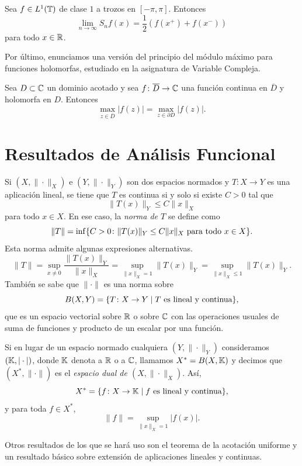 \documentclass[a4paper, 12pt]{book}
\begin{document}
\begin{theorem}\label{1.2.11}
    Sea $f \in L^1(\mathbb T)$ de clase $1$ a trozos en $[-\pi,\pi]$. Entonces
    \[\lim_{n\to\infty}S_nf(x) = \frac{1}{2}(f(x^+)+f(x^-))\]
    para todo $x \in \mathbb R$.
\end{theorem}

Por último, enunciamos una versión del principio del módulo máximo para funciones holomorfas, estudiado en la asignatura de Variable Compleja.

\begin{theorem}\label{1.2.12}
    Sea $D\subset\mathbb C$ un dominio acotado y sea $f \colon \overline{D} \to \mathbb C$ una función continua en $\overline{D}$ y holomorfa en $D$. Entonces
    \[\max_{z\in\overline{D}}|f(z)| = \max_{z \in \partial D}|f(z)|.\]
\end{theorem}

\section{Resultados de Análisis Funcional}

Si $(X,\|\cdot\|_X)$ e $(Y,\|\cdot\|_Y)$ son dos espacios normados y $T \colon X \to Y$ es una aplicación lineal, se tiene que $T$ es continua si y solo si existe $C > 0$ tal que
\[\|T(x)\|_Y \leq C\|x\|_X\]
para todo $x \in X$. En ese caso, la \emph{norma de $T$} se define como
\[\|T\| = \inf\{C > 0 \colon \|T(x)\|_Y \leq C\|x\|_X \textup{ para todo } x \in X\}.\]
Esta norma admite algunas expresiones alternativas.
\[\|T\| = \sup_{x \neq 0} \frac{\|T(x)\|_Y}{\|x\|_X} = \sup_{\|x\|_X = 1} \|T(x)\|_Y = \sup_{\|x\|_X \leq 1} \|T(x)\|_Y.\]
También se sabe que $\|\cdot\|$ es una norma sobre
\[B(X,Y) = \{T \colon X \to Y \mid T \textup{ es lineal y continua}\},\]
que es un espacio vectorial sobre $\mathbb R$ o sobre $\mathbb C$ con las operaciones usuales de suma de funciones y producto de un escalar por una función.

Si en lugar de un espacio normado cualquiera $(Y,\|\cdot\|_Y)$ consideramos $(\mathbb K,|\cdot|)$, donde $\mathbb K$ denota a $\mathbb R$ o a $\mathbb C$, llamamos $X^* = B(X,\mathbb K)$ y decimos que $(X^*,\|\cdot\|)$ es el \emph{espacio dual de $(X,\|\cdot\|_X)$}. Así,
\[X^* = \{f \colon X \to \mathbb K \mid f \textup{ es lineal y continua}\},\]
y para toda $f \in X^*$,
\[\|f\| = \sup_{\|x\|_X=1}|f(x)|.\]

Otros resultados de los que se hará uso son el teorema de la acotación uniforme y un resultado básico sobre extensión de aplicaciones lineales y continuas.
\end{document}
